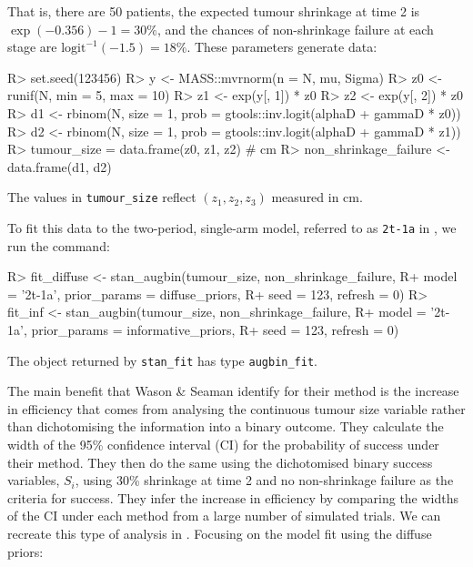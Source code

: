 \documentclass[article]{jss}
\begin{document}
That is, there are 50 patients, the expected tumour shrinkage at time 2
is \(\exp(-0.356) - 1 = 30\%\), and the chances of non-shrinkage failure
at each stage are \(\text{logit}^{-1}(-1.5) = 18\%\). These parameters
generate data:

\begin{CodeChunk}

\begin{CodeInput}
R> set.seed(123456)
R> y <- MASS::mvrnorm(n = N, mu, Sigma)
R> z0 <- runif(N, min = 5, max = 10)
R> z1 <- exp(y[, 1]) * z0
R> z2 <- exp(y[, 2]) * z0
R> d1 <- rbinom(N, size = 1, prob = gtools::inv.logit(alphaD + gammaD * z0))
R> d2 <- rbinom(N, size = 1, prob = gtools::inv.logit(alphaD + gammaD * z1))
R> tumour_size = data.frame(z0, z1, z2) # cm
R> non_shrinkage_failure <- data.frame(d1, d2)
\end{CodeInput}
\end{CodeChunk}

The values in \texttt{tumour\_size} reflect \((z_1, z_2, z_3)\) measured
in cm.

To fit this data to the two-period, single-arm model, referred to as
\texttt{2t-1a} in , we run the command:

\begin{CodeChunk}

\begin{CodeInput}
R> fit_diffuse <- stan_augbin(tumour_size, non_shrinkage_failure, 
R+                            model = '2t-1a', prior_params = diffuse_priors, 
R+                            seed = 123, refresh = 0)
R> fit_inf <- stan_augbin(tumour_size, non_shrinkage_failure, 
R+                        model = '2t-1a', prior_params = informative_priors, 
R+                        seed = 123, refresh = 0)
\end{CodeInput}
\end{CodeChunk}

The object returned by \texttt{stan\_fit} has type \texttt{augbin\_fit}.

The main benefit that Wason \& Seaman identify for their method is the
increase in efficiency that comes from analysing the continuous tumour
size variable rather than dichotomising the information into a binary
outcome. They calculate the width of the 95\% confidence interval (CI)
for the probability of success under their method. They then do the same
using the dichotomised binary success variables, \(S_i\), using 30\%
shrinkage at time 2 and no non-shrinkage failure as the criteria for
success. They infer the increase in efficiency by comparing the widths
of the CI under each method from a large number of simulated trials. We
can recreate this type of analysis in . Focusing on the
model fit using the diffuse priors:
\end{document}
